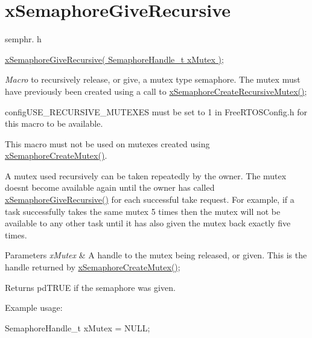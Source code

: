 \hypertarget{group__x_semaphore_give_recursive}{}\section{x\+Semaphore\+Give\+Recursive}
\label{group__x_semaphore_give_recursive}
semphr. h 
\begin{DoxyPre}
\hyperlink{vendor_2ceedling_2plugins_2freertos_2src_2freertos_2include_2semphr_8h_a398d66b17856c22dd49d39aaac42f105}{xSemaphoreGiveRecursive( SemaphoreHandle\_t xMutex )};
\end{DoxyPre}


{\itshape Macro} to recursively release, or \textquotesingle{}give\textquotesingle{}, a mutex type semaphore. The mutex must have previously been created using a call to \hyperlink{vendor_2ceedling_2plugins_2freertos_2src_2freertos_2include_2semphr_8h_a1bbc843be5a41ea83d2693b2189fc0f8}{x\+Semaphore\+Create\+Recursive\+Mutex()};

config\+U\+S\+E\+\_\+\+R\+E\+C\+U\+R\+S\+I\+V\+E\+\_\+\+M\+U\+T\+E\+X\+ES must be set to 1 in Free\+R\+T\+O\+S\+Config.\+h for this macro to be available.

This macro must not be used on mutexes created using \hyperlink{vendor_2ceedling_2plugins_2freertos_2src_2freertos_2include_2semphr_8h_aa6a00aa9b91a9e5b3ebe4ae1c3f115c6}{x\+Semaphore\+Create\+Mutex()}.

A mutex used recursively can be \textquotesingle{}taken\textquotesingle{} repeatedly by the owner. The mutex doesn\textquotesingle{}t become available again until the owner has called \hyperlink{vendor_2ceedling_2plugins_2freertos_2src_2freertos_2include_2semphr_8h_a398d66b17856c22dd49d39aaac42f105}{x\+Semaphore\+Give\+Recursive()} for each successful \textquotesingle{}take\textquotesingle{} request. For example, if a task successfully \textquotesingle{}takes\textquotesingle{} the same mutex 5 times then the mutex will not be available to any other task until it has also \textquotesingle{}given\textquotesingle{} the mutex back exactly five times.


\begin{DoxyParams}{Parameters}
{\em x\+Mutex} & A handle to the mutex being released, or \textquotesingle{}given\textquotesingle{}. This is the handle returned by \hyperlink{vendor_2ceedling_2plugins_2freertos_2src_2freertos_2include_2semphr_8h_aa6a00aa9b91a9e5b3ebe4ae1c3f115c6}{x\+Semaphore\+Create\+Mutex()};\\
\hline
\end{DoxyParams}
\begin{DoxyReturn}{Returns}
pd\+T\+R\+UE if the semaphore was given.
\end{DoxyReturn}
Example usage\+: 
\begin{DoxyPre}
SemaphoreHandle\_t xMutex = NULL;\end{DoxyPre}



